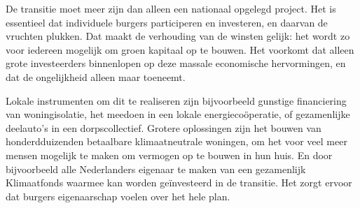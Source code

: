 
De transitie moet meer zijn dan alleen een nationaal opgelegd project. Het is essentieel dat individuele burgers participeren en investeren, en daarvan de vruchten plukken. Dat maakt de verhouding van de winsten gelijk: het wordt zo voor iedereen mogelijk om groen kapitaal op te bouwen. Het voorkomt dat alleen grote investeerders binnenlopen op deze massale economische hervormingen, en dat de ongelijkheid alleen maar toeneemt.

Lokale instrumenten om dit te realiseren zijn bijvoorbeeld gunstige financiering van woningisolatie, het meedoen in een lokale energiecoöperatie, of gezamenlijke deelauto’s in een dorpscollectief. Grotere oplossingen zijn het bouwen van honderdduizenden betaalbare klimaatneutrale woningen, om het voor veel meer mensen mogelijk te maken om vermogen op te bouwen in hun huis. En door bijvoorbeeld alle Nederlanders eigenaar te maken van een gezamenlijk Klimaatfonds waarmee kan worden geïnvesteerd in de transitie. Het zorgt ervoor dat burgers eigenaarschap voelen over het hele plan.
